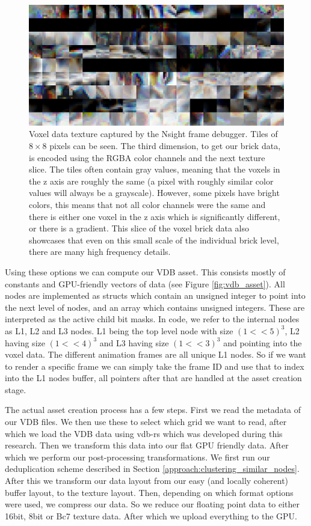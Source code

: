 \begin{figure}
    \centering
    \includegraphics[width=\linewidth]{figures/voxel_memory_view.png}
    \caption{Voxel data texture captured by the Nsight frame debugger. Tiles of $8\times 8$ pixels can be seen. The third dimension, to get our brick data, is encoded using the RGBA color channels and the next texture slice. The tiles often contain gray values, meaning that the voxels in the z axis are roughly the same (a pixel with roughly similar color values will always be a grayscale). However, some pixels have bright colors, this means that not all color channels were the same and there is either one voxel in the z axis which is significantly different, or there is a gradient. This slice of the voxel brick data also showcases that even on this small scale of the individual brick level, there are many high frequency details.}
    \label{fig:vdb_asset:memory_view}
\end{figure}


Using these options we can compute our VDB asset. This consists mostly of constants and GPU-friendly vectors of data (see Figure \ref{fig:vdb_asset}). All nodes are implemented as structs which contain an unsigned integer to point into the next level of nodes, and an array which contains unsigned integers. These are interpreted as the active child bit masks. In code, we refer to the internal nodes as L1, L2 and L3 nodes. L1 being the top level node with size $(1 << 5)^3$, L2 having size $(1 << 4)^3$ and L3 having size $(1 << 3)^3$ and pointing into the voxel data. The different animation frames are all unique L1 nodes. So if we want to render a specific frame we can simply take the frame ID and use that to index into the L1 nodes buffer, all pointers after that are handled at the asset creation stage.

The actual asset creation process has a few steps. First we read the metadata of our VDB files. We then use these to select which grid we want to read, after which we load the VDB data using vdb-rs \cite{VDBRS} which was developed during this research. Then we transform this data into our flat GPU friendly data. After which we perform our post-processing transformations. We first run our deduplication scheme described in Section \ref{approach:clustering_similar_nodes}. After this we transform our data layout from our easy (and locally coherent) buffer layout, to the texture layout. Then, depending on which format options were used, we compress our data. So we reduce our floating point data to either 16bit, 8bit or Bc7 texture data. After which we upload everything to the GPU.




